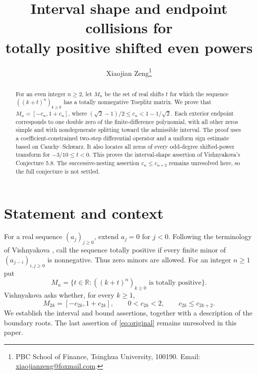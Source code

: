 \documentclass[11pt]{article}
\title{Interval shape and endpoint collisions for\protect\\
totally positive shifted even powers}
\author{Xiaojian Zeng\thanks{PBC School of Finance, Tsinghua University,
100190. Email: \href{mailto:xiaojianzeng@foxmail.com}{xiaojianzeng@foxmail.com}.}}
\date{}
\theoremstyle{remark}
\newcommand{\R}{\mathbb{R}}
\begin{document}
\maketitle
\begin{abstract}
For an even integer $n\ge2$, let $M_n$ be the set of real shifts $t$ for
which the sequence $((k+t)^n)_{k\ge0}$ has a totally nonnegative Toeplitz
matrix. We prove that $M_n=[-c_n,1+c_n]$, where
$(\sqrt2-1)/2\le c_n<1-1/\sqrt2$. Each exterior endpoint corresponds to
one double zero of the finite-difference polynomial, with all other zeros
simple and with nondegenerate splitting toward the admissible interval.
The proof uses a coefficient-constrained two-step differential operator
and a uniform sign estimate based on Cauchy--Schwarz. It also locates all
zeros of every odd-degree shifted-power transform for $-3/10\le t<0$.
This proves the interval-shape assertion of Vishnyakova's Conjecture 5.8.
The successive-nesting assertion $c_n\le c_{n+2}$ remains unresolved here,
so the full conjecture is not settled.
\end{abstract}

\section{Statement and context}

For a real sequence $(a_j)_{j\ge0}$, extend $a_j=0$ for $j<0$.
Following the terminology of Vishnyakova \cite{Vishnyakova2026}, call the
sequence totally positive if every finite minor of
$(a_{j-i})_{i,j\ge0}$ is nonnegative. Thus zero minors are allowed.
For an integer $n\ge1$ put
\[
 M_n=\{t\in\R: ((k+t)^n)_{k\ge0}\text{ is totally positive}\}.
\]
Vishnyakova \cite[Example 5.7 and Conjecture 5.8]{Vishnyakova2026}
asks whether, for every $k\ge1$,
\begin{equation}\label{eq:original}
 M_{2k}=[-c_{2k},1+c_{2k}],\qquad 0<c_{2k}<2,
 \qquad c_{2k}\le c_{2k+2}.
\end{equation}
We establish the interval and bound assertions, together with a description
of the boundary roots. The last assertion of \eqref{eq:original} remains
unresolved in this paper.
\end{document}
